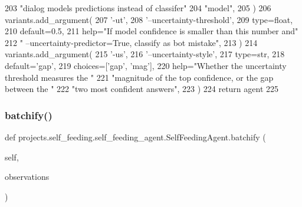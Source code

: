 \begin{DoxyCode}
203             \textcolor{stringliteral}{"dialog models predictions instead of classifer"}
204             \textcolor{stringliteral}{"model"},
205         )
206         variants.add\_argument(
207             \textcolor{stringliteral}{'-ut'},
208             \textcolor{stringliteral}{'--uncertainty-threshold'},
209             type=float,
210             default=0.5,
211             help=\textcolor{stringliteral}{"If model confidence is smaller than this number and"}
212             \textcolor{stringliteral}{" --uncertainty-predictor=True, classify as bot mistake"},
213         )
214         variants.add\_argument(
215             \textcolor{stringliteral}{'-us'},
216             \textcolor{stringliteral}{'--uncertainty-style'},
217             type=str,
218             default=\textcolor{stringliteral}{'gap'},
219             choices=[\textcolor{stringliteral}{'gap'}, \textcolor{stringliteral}{'mag'}],
220             help=\textcolor{stringliteral}{"Whether the uncertainty threshold measures the "}
221             \textcolor{stringliteral}{"magnitude of the top confidence, or the gap between the "}
222             \textcolor{stringliteral}{"two most confident answers"},
223         )
224         \textcolor{keywordflow}{return} agent
225 
\end{DoxyCode}
\mbox{\label{classprojects_1_1self__feeding_1_1self__feeding__agent_1_1SelfFeedingAgent_a72c574a9342e5cf9e268ad0cb7a1e721}} 
\subsubsection{\texorpdfstring{batchify()}{batchify()}}
{\footnotesize\ttfamily def projects.\+self\+\_\+feeding.\+self\+\_\+feeding\+\_\+agent.\+Self\+Feeding\+Agent.\+batchify (\begin{DoxyParamCaption}\item[{}]{self,  }\item[{}]{observations }\end{DoxyParamCaption})}



